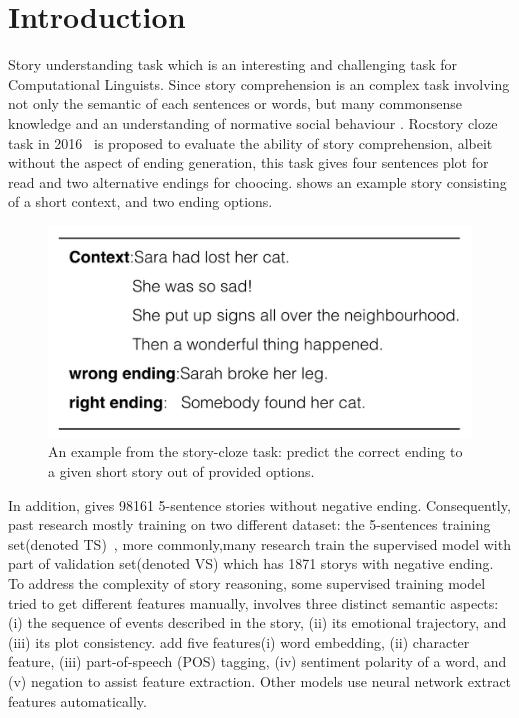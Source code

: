 \section{Introduction}
\label{sec:intro}


Story understanding task which is an interesting and challenging task for Computational Linguists\cite{mani2012computational}. Since story comprehension is an complex task involving not only the semantic of each sentences or words, but many commonsense knowledge and an understanding of normative social behaviour \cite{charniak1972toward}. Rocstory cloze task in 2016~\cite{mostafazadeh2016corpus} is proposed to evaluate the ability of story comprehension, albeit without the aspect of ending generation, this task gives four sentences plot for read and two alternative endings for choocing.  shows an example story consisting of a short context, and two ending options.

%
\begin{figure}[th]
	\centering
	\includegraphics[width=1.0\columnwidth]{figures/shanshan1}
	\caption{An example from the story-cloze task: predict the correct ending to a given short story out of provided options.}
	\label{fig:shanshan1}
\end{figure}
%
In addition, \citeauthor{mostafazadeh2016corpus} gives 98161 5-sentence stories without negative ending. Consequently, past research mostly training on two different dataset: the 5-sentences training set(denoted TS)~\cite{roemmele2017rnn,wang2017conditional}, more commonly,many research \cite{srinivasan2018simple,chaturvedi2017story,cai2017pay,li2018story} train the supervised model with part of validation set(denoted VS) which has 1871 storys with negative ending. To address the complexity of story reasoning, some supervised training model tried to get different features manually, \citeauthor{chaturvedi2017story}involves three distinct semantic aspects: (i) the sequence of events described in the story, (ii) its emotional trajectory, and (iii) its plot consistency. \citeauthor{li2018story}add five features(i) word embedding, (ii) character feature, (iii) part-of-speech (POS) tagging, (iv) sentiment polarity of a word, and (v) negation to assist feature extraction. Other models \cite{srinivasan2018simple,cai2017pay,roemmele2017rnn} use neural network extract features automatically.
%

